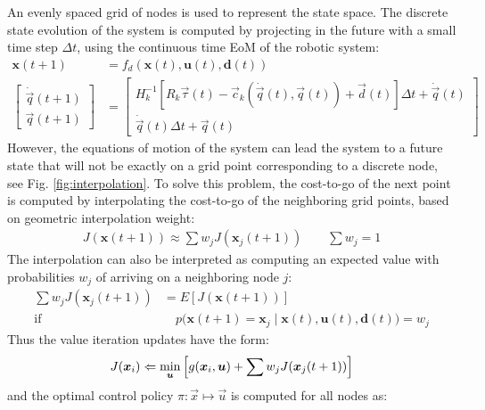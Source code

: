 An evenly spaced grid of nodes is used to represent the state space. The discrete state evolution of the system is computed by projecting in the future with a small time step $\Delta t$, using the continuous time EoM of the robotic system:
%
\begin{align}
\boldsymbol{x}(t+1) &= f_d( \boldsymbol{x}(t) , \boldsymbol{u}(t) , \boldsymbol{d}(t) ) \\
\left[ \begin{array}{c} 
	\dot{\vec{q}}(t+1) \\ \vec{q}(t+1)
\end{array} \right] &= 
\left[ \begin{array}{c} 
	H_k^{-1} \left[ R_k \vec{\tau}(t) - \vec{c}_k( \dot{\vec{q}}(t) , \vec{q}(t))  + \vec{d}(t)  \right] \Delta t + \dot{\vec{q}}(t)  \\ \dot{\vec{q}}(t)  \Delta t + \vec{q}(t) 
\end{array} \right]
\end{align}
%
However, the equations of motion of the system can lead the system to a future state that will not be exactly on a grid point corresponding to a discrete node, see Fig. \ref{fig:interpolation}. To solve this problem, the cost-to-go of the next point is computed by interpolating the cost-to-go of the neighboring grid points, based on geometric interpolation weight:
%
\begin{align}
	J(\boldsymbol{x}(t+1)) \approx \sum{ w_j J(\boldsymbol{x}_j(t+1)) }  \quad \quad \sum{ w_j  } = 1
	\label{eq:interpol}
\end{align}
%
The interpolation can also be interpreted as computing an expected value with probabilities $w_j$ of arriving on a neighboring node $j$:
%
\begin{align}
	\sum{ w_j J(\boldsymbol{x}_j(t+1)) }   &= E \left[ J(\boldsymbol{x}(t+1)) \right] \\ 
	\text{if} & \quad
	p \Big(
	\boldsymbol{x}(t+1) = \boldsymbol{x}_j 
	\; \Big| \; 
	\boldsymbol{x}(t) , \boldsymbol{u}(t) , \boldsymbol{d}(t) 
	\Big)  = w_j
	\label{eq:expectation}
\end{align}
%
Thus the value iteration updates have the form:
%
\begin{align}
	J(\boldsymbol{x}_i) \Leftarrow \operatornamewithlimits{min}\limits_{\boldsymbol{u}} 
	\left[ g(\boldsymbol{x}_i,\boldsymbol{u}) + \sum{ w_j J(\boldsymbol{x}_j(t+1))}  \right]
		\label{eq:interpol}
\end{align}
%
and the optimal control policy $\pi:\vec{x}\mapsto\vec{u}$ is computed for all nodes as:
